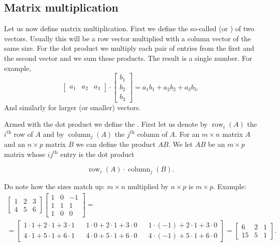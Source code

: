 \documentclass{ximera}
\begin{document}
\subsection{Matrix multiplication}

Let us now define matrix multiplication.  First we define the so-called \emph{} (or \emph{}) of two vectors. Usually this will be a row vector multiplied with a column vector of the same size.  For the dot product we multiply each pair of entries from the first and the second vector and we sum these products.  The result is a single number. For example,
\begin{equation*}
    \begin{bmatrix}
        a_1 & a_2 & a_3
    \end{bmatrix}
    \cdot
    \begin{bmatrix}
        b_1 \\
        b_2 \\
        b_3
    \end{bmatrix}
    = a_1 b_1 + a_2 b_2 + a_3 b_3 .
\end{equation*}
And similarly for larger (or smaller) vectors.

Armed with the dot product we define the \emph{}. First let us denote by $\operatorname{row}_i(A)$ the $i^{\text{th}}$ row of $A$ and by $\operatorname{column}_j(A)$ the $j^{\text{th}}$ column of $A$. For an $m \times n$ matrix $A$ and an $n \times p$ matrix $B$ we can define the product $AB$.  We let $AB$ be an $m \times p$ matrix whose $ij^{\text{th}}$ entry is the dot product 

\begin{equation*}
    \operatorname{row}_i(A) \cdot \operatorname{column}_j(B) .
\end{equation*}

Do note how the sizes match up: $m \times n$ multiplied by $n \times p$ is $m \times p$.  Example:
\begin{multline*}
    \begin{bmatrix}
        1 & 2 & 3 \\
        4 & 5 & 6
    \end{bmatrix}
    \begin{bmatrix}
        1 & 0 & -1 \\
        1 & 1 & 1 \\
        1 & 0 & 0
    \end{bmatrix}
    = \\ =
    \begin{bmatrix}
        1\cdot 1 + 2\cdot 1 + 3 \cdot 1 &  & 1\cdot 0 + 2\cdot 1 + 3 \cdot 0 &  & 1\cdot (-1) + 2\cdot 1 + 3 \cdot 0 \\
        4\cdot 1 + 5\cdot 1 + 6 \cdot 1 &  & 4\cdot 0 + 5\cdot 1 + 6 \cdot 0 &  & 4\cdot (-1) + 5\cdot 1 + 6 \cdot 0
    \end{bmatrix}
    =
    \begin{bmatrix}
        6 & 2 & 1 \\
        15 & 5 & 1
    \end{bmatrix}.
\end{multline*}
\end{document}
